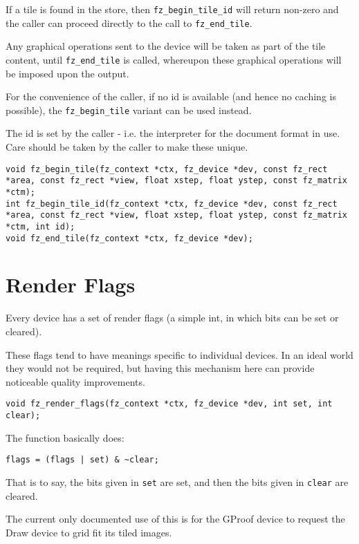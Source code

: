 \documentclass[oneside]{book}
\begin{document}
If a tile is found in the store, then \texttt{fz\_begin\_tile\_id} will return non-zero and the caller can proceed directly to the call to \texttt{fz\_end\_tile}.

Any graphical operations sent to the device will be taken as part of the tile content, until \texttt{fz\_end\_tile} is called, whereupon these graphical operations will be imposed upon the output.

For the convenience of the caller, if no id is available (and hence no caching is possible), the \texttt{fz\_begin\_tile} variant can be used instead.

The id is set by the caller - i.e. the interpreter for the document format in use. Care should be taken by the caller to make these unique.


\begin{lstlisting}
void fz_begin_tile(fz_context *ctx, fz_device *dev, const fz_rect *area, const fz_rect *view, float xstep, float ystep, const fz_matrix *ctm);
int fz_begin_tile_id(fz_context *ctx, fz_device *dev, const fz_rect *area, const fz_rect *view, float xstep, float ystep, const fz_matrix *ctm, int id);
void fz_end_tile(fz_context *ctx, fz_device *dev);
\end{lstlisting}

\section{Render Flags}

Every device has a set of render flags (a simple int, in which bits can be set or cleared).

These flags tend to have meanings specific to individual devices. In an ideal world they would not be required, but having this mechanism here can provide noticeable quality improvements.

\begin{lstlisting}
void fz_render_flags(fz_context *ctx, fz_device *dev, int set, int clear);
\end{lstlisting}

The function basically does:

\begin{lstlisting}
flags = (flags | set) & ~clear;
\end{lstlisting}

That is to say, the bits given in \texttt{set} are set, and then the bits given in \texttt{clear} are cleared.

The current only documented use of this is for the GProof device to request the Draw device to grid fit its tiled images.
\end{document}

